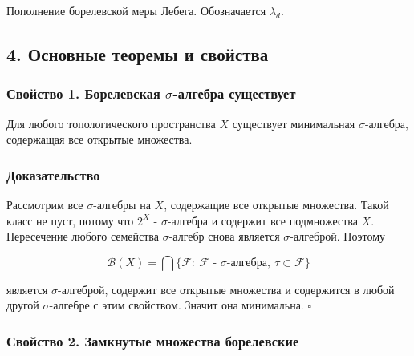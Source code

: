 \documentclass[
  11pt,
  a4paper,
]{article}
\begin{document}
Пополнение борелевской меры Лебега. Обозначается \(\lambda_d\).

\subsection{4. Основные теоремы и
свойства}\label{ux43eux441ux43dux43eux432ux43dux44bux435-ux442ux435ux43eux440ux435ux43cux44b-ux438-ux441ux432ux43eux439ux441ux442ux432ux430}

\subsubsection{\texorpdfstring{Свойство 1. Борелевская
\(\sigma\)-алгебра
существует}{Свойство 1. Борелевская \textbackslash sigma-алгебра существует}}\label{ux441ux432ux43eux439ux441ux442ux432ux43e-1.-ux431ux43eux440ux435ux43bux435ux432ux441ux43aux430ux44f-sigma-ux430ux43bux433ux435ux431ux440ux430-ux441ux443ux449ux435ux441ux442ux432ux443ux435ux442}

Для любого топологического пространства \(X\) существует минимальная
\(\sigma\)-алгебра, содержащая все открытые множества.

\subsubsection{Доказательство}\label{ux434ux43eux43aux430ux437ux430ux442ux435ux43bux44cux441ux442ux432ux43e}

Рассмотрим все \(\sigma\)-алгебры на \(X\), содержащие все открытые
множества. Такой класс не пуст, потому что \(2^X\) - \(\sigma\)-алгебра
и содержит все подмножества \(X\). Пересечение любого семейства
\(\sigma\)-алгебр снова является \(\sigma\)-алгеброй. Поэтому

\[
\mathcal B(X)=
\bigcap\{\mathcal F:\ \mathcal F\text{ - }\sigma\text{-алгебра},\ \tau\subset\mathcal F\}
\]

является \(\sigma\)-алгеброй, содержит все открытые множества и
содержится в любой другой \(\sigma\)-алгебре с этим свойством. Значит
она минимальна. \(\square\)

\subsubsection{Свойство 2. Замкнутые множества
борелевские}\label{ux441ux432ux43eux439ux441ux442ux432ux43e-2.-ux437ux430ux43cux43aux43dux443ux442ux44bux435-ux43cux43dux43eux436ux435ux441ux442ux432ux430-ux431ux43eux440ux435ux43bux435ux432ux441ux43aux438ux435}
\end{document}
